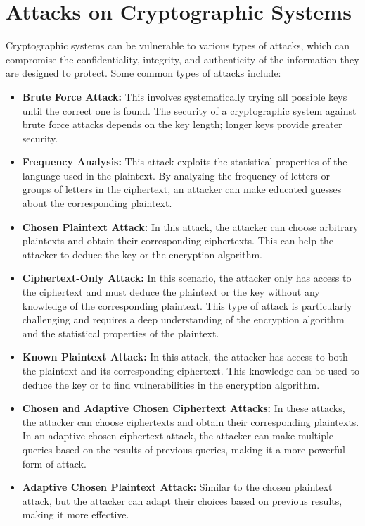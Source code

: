 \documentclass[openany]{book}
\begin{document}
\section{Attacks on Cryptographic Systems}
Cryptographic systems can be vulnerable to various types of attacks, which can compromise the confidentiality, integrity, and authenticity of the information they are designed to protect. Some common types of attacks include:
\begin{itemize}
    \item \textbf{Brute Force Attack:} This involves systematically trying all possible keys until the correct one is found. The security of a cryptographic system against brute force attacks depends on the key length; longer keys provide greater security.
    \item \textbf{Frequency Analysis:} This attack exploits the statistical properties of the language used in the plaintext. By analyzing the frequency of letters or groups of letters in the ciphertext, an attacker can make educated guesses about the corresponding plaintext.
    \item \textbf{Chosen Plaintext Attack:} In this attack, the attacker can choose arbitrary plaintexts and obtain their corresponding ciphertexts. This can help the attacker to deduce the key or the encryption algorithm.
    \item \textbf{Ciphertext-Only Attack:} In this scenario, the attacker only has access to the ciphertext and must deduce the plaintext or the key without any knowledge of the corresponding plaintext. This type of attack is particularly challenging and requires a deep understanding of the encryption algorithm and the statistical properties of the plaintext.
    \item \textbf{Known Plaintext Attack:} In this attack, the attacker has access to both the plaintext and its corresponding ciphertext. This knowledge can be used to deduce the key or to find vulnerabilities in the encryption algorithm.
    \item \textbf{Chosen and Adaptive Chosen Ciphertext Attacks:} In these attacks, the attacker can choose ciphertexts and obtain their corresponding plaintexts. In an adaptive chosen ciphertext attack, the attacker can make multiple queries based on the results of previous queries, making it a more powerful form of attack.
    \item \textbf{Adaptive Chosen Plaintext Attack:} Similar to the chosen plaintext attack, but the attacker can adapt their choices based on previous results, making it more effective.
\end{itemize}
\end{document}
